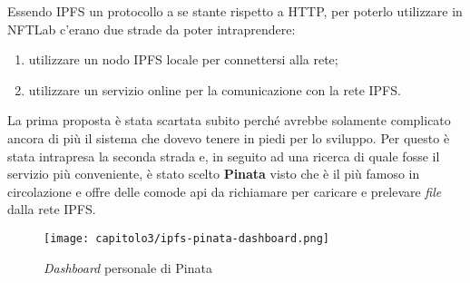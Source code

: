 


Essendo IPFS un protocollo a se stante rispetto a HTTP, per poterlo utilizzare in NFTLab c'erano due strade da poter intraprendere:
\begin{enumerate}
  \item utilizzare un nodo IPFS locale per connettersi alla rete;
  \item utilizzare un servizio online per la comunicazione con la rete IPFS.
\end{enumerate}

La prima proposta è stata scartata subito perché avrebbe solamente complicato ancora di più il sistema che dovevo tenere in piedi per lo sviluppo. Per questo è stata intrapresa la seconda strada e, in seguito ad una ricerca di quale fosse il servizio più conveniente, è stato scelto \textbf{Pinata} visto che è il più famoso in circolazione e  offre delle comode \gls{api} da richiamare per caricare e prelevare \textit{file} dalla rete IPFS.

\clearpage
\begin{figure}[h!]
  \centering
  \texttt{[image: capitolo3/ipfs-pinata-dashboard.png]}
  \caption{\textit{Dashboard} personale di Pinata}
\end{figure}
